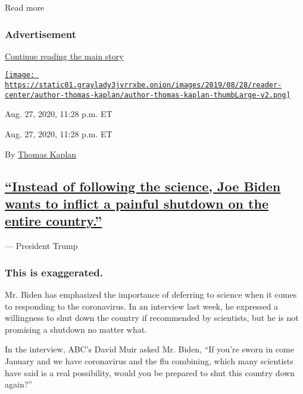 Read more

\hypertarget{advertisement-2}{%
\subsubsection{Advertisement}\label{advertisement-2}}

\protect\hyperlink{after-dfp-ad-mid3}{Continue reading the main story}

\href{https://www.nytimes3xbfgragh.onion/by/thomas-kaplan}{\texttt{[image: https://static01.graylady3jvrrxbe.onion/images/2019/08/28/reader-center/author-thomas-kaplan/author-thomas-kaplan-thumbLarge-v2.png]}}

Aug. 27, 2020, 11:28 p.m. ET

Aug. 27, 2020, 11:28 p.m. ET

By \href{https://www.nytimes3xbfgragh.onion/by/thomas-kaplan}{Thomas
Kaplan}

\hypertarget{instead-of-following-the-science-joe-biden-wants-to-inflict-a-painful-shutdown-on-the-entire-country}{%
\subsection{\texorpdfstring{\protect\hyperlink{instead-of-following-the-science-joe-biden-wants-to-inflict-a-painful-shutdown-on-the-entire-country}{``Instead
of following the science, Joe Biden wants to inflict a painful shutdown
on the entire
country.''}}{``Instead of following the science, Joe Biden wants to inflict a painful shutdown on the entire country.''}}\label{instead-of-following-the-science-joe-biden-wants-to-inflict-a-painful-shutdown-on-the-entire-country}}

--- President Trump

\hypertarget{this-is-exaggerated}{%
\subsubsection{This is exaggerated.}\label{this-is-exaggerated}}

Mr. Biden has emphasized the importance of deferring to science when it
comes to responding to the coronavirus. In an interview last week, he
expressed a willingness to shut down the country if recommended by
scientists, but he is not promising a shutdown no matter what.

In the interview, ABC's David Muir asked Mr. Biden, ``If you're sworn in
come January and we have coronavirus and the flu combining, which many
scientists have said is a real possibility, would you be prepared to
shut this country down again?''

